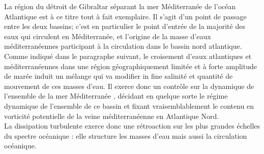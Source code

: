 
La région du détroit de Gibraltar séparant la mer Méditerranée de l'océan Atlantique est à ce titre tout à fait exemplaire. Il s'agit d'un point de passage entre les deux bassins; c'est en particulier le point d'entrée de la majorité des eaux qui circulent en Méditerranée, et l'origine de la masse d'eaux méditerranéennes participant à la circulation dans le bassin nord atlantique. Comme indiqué dans le paragraphe suivant, le croisement d'eaux atlantiques et méditerranéennes dans une région géographiquement limitée et à forte amplitude de marée induit un mélange qui va modifier in fine salinité et quantité de mouvement de ces masses d'eau. Il exerce donc un contrôle sur la dynamique de l'ensemble de la mer Méditerranée \citep{FA1988}, décidant en quelque sorte le régime dynamique de l'ensemble de ce bassin et fixant vraisemblablement le contenu en vorticité potentielle de la veine méditerranéenne en Atlantique Nord.\\


La dissipation turbulente exerce donc une rétroaction sur les plus grandes échelles du spectre océanique : elle  structure les masses d'eau mais aussi la circulation océanique.
\color{black}

